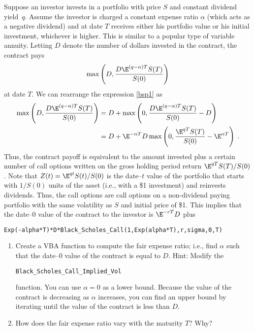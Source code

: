 \begin{prob}
\end{prob}\begin{prob} Suppose an investor invests in a portfolio with price $S$ and constant dividend yield~$q$.  Assume the investor is charged a constant expense ratio $\alpha$ (which acts as a negative dividend) and at date $T$ receives either his portfolio value or his initial investment, whichever is higher.  This is similar to a popular type of variable annuity.  Letting $D$ denote the number of dollars invested in the contract, the contract pays
\begin{equation}\label{bsp1}
\max\left(D,\frac{D\E^{(q-\alpha)T}S(T)}{S(0)}\right)
\end{equation}
at date $T$.  
We can rearrange the expression \eqref{bsp1} as
\begin{align}
\max\left(D,\frac{D\E^{(q-\alpha)T}S(T)}{S(0)}\right) &= D + \max\left(0, \frac{D\E^{(q-\alpha)T}S(T)}{S(0)}-D\right)\notag\\
&= D + \E^{-\alpha T}D\max\left(0,\frac{\E^{qT}S(T)}{S(0)}-\E^{\alpha T}\right)\;.\label{bsp2}
\end{align}
Thus, the contract payoff is equivalent to the amount invested plus a certain number of call options written on the gross holding period return $\E^{qT}S(T)/S(0)$.  Note that $Z(t) = \E^{qt}S(t)/S(0)$ is the date--$t$ value of the portfolio that starts with $1/S(0)$ units of the asset (i.e., with a \$1 investment) and reinvests dividends.  Thus, the call options are call options on a non-dividend paying portfolio with the same volatility as $S$ and initial price of \$1.  This implies that the date--0 value of the contract to the investor is $\E^{-rT}D$ plus
\small\begin{verbatim}
Exp(-alpha*T)*D*Black_Scholes_Call(1,Exp(alpha*T),r,sigma,0,T)
\end{verbatim}\normalsize

\begin{enumerate}
\renewcommand{\labelenumi}{(\alph{enumi})}
\item Create a VBA function  to compute the fair expense ratio; i.e., find $\alpha$ such that the date--0 value of the contract is equal to $D$.  Hint:  Modify the
\small \begin{center}\verb!Black_Scholes_Call_Implied_Vol! 
\end{center}\normalsize
function.  You can use $\alpha=0$ as a lower bound.  Because the value of the contract is decreasing as $\alpha$ increases, you can find an upper bound by iterating until the value of the contract is less than $D$.
\item  How does the fair expense ratio vary with the maturity $T$?  Why?
\end{enumerate}


\end{prob}
